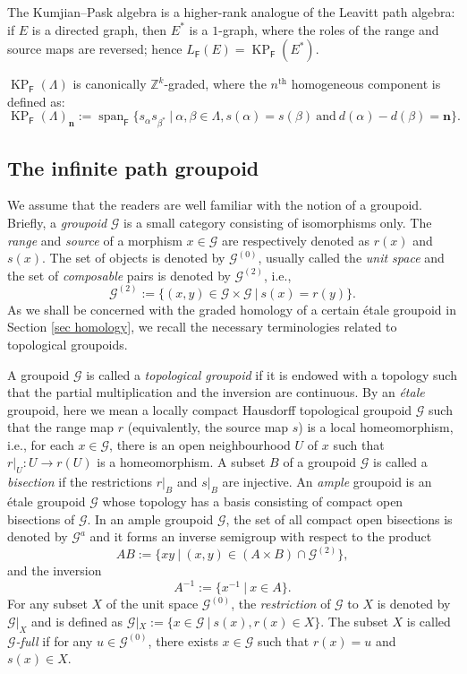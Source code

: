 \documentclass[12pt]{amsart}
\newcommand{\N}{\mathbf{n}}
\newcommand{\KP}{\operatorname{KP}}
\theoremstyle{definition}
\theoremstyle{remark}
\newcommand{\lspan}{\operatorname{span}}
\begin{document}
The Kumjian--Pask algebra is a higher-rank analogue of the Leavitt path algebra: if $E$ is a directed graph, then $E^*$ is a $1$-graph, where the roles of the range and source maps are reversed; hence $L_\mathsf{F} (E) = \KP_{\mathsf{F}} ( E^* )$.

$\KP_{\mathsf{F}} ( \Lambda )$ is canonically $\mathbb{Z}^k$-graded, where the $n^{\text{th}}$ homogeneous component is defined as: \[\KP_\mathsf{F}(\Lambda)_\N:=\lspan_\mathsf{F} \{s_\alpha s_{\beta^*}~|~\alpha,\beta\in \Lambda, s(\alpha)=s(\beta)~\text{and}~d(\alpha)-d(\beta)=\N\}.\]


\subsection{The infinite path groupoid}\label{ssec path groupoid}
We assume that the readers are well familiar with the notion of a groupoid. Briefly, a \emph{groupoid} $\mathcal{G}$ is a small category consisting of isomorphisms only. The \emph{range} and \emph{source} of a morphism $x\in \mathcal{G}$ are respectively denoted as $r(x)$ and $s(x)$. The set of objects is denoted by $\mathcal{G}^{(0)}$, usually called the \emph{unit space} and the set of \emph{composable} pairs is denoted by $\mathcal{G}^{(2)}$, i.e., \[\mathcal{G}^{(2)}:=\{(x,y)\in \mathcal{G}\times \mathcal{G}~|~s(x)=r(y)\}.\] As we shall be concerned with the graded homology of a certain \'{e}tale groupoid in Section \ref{sec homology}, we recall the necessary terminologies related to topological groupoids.

A groupoid $\mathcal{G}$ is called a \emph{topological groupoid} if it is endowed with a topology such that the partial multiplication and the inversion are continuous. By an \emph{\'{e}tale} groupoid, here we mean a locally compact Hausdorff topological groupoid $\mathcal{G}$ such that the range map $r$ (equivalently, the source map $s$) is a local homeomorphism, i.e., for each $x\in \mathcal{G}$, there is an open neighbourhood $U$ of $x$ such that $r|_U:U\longrightarrow r(U)$ is a homeomorphism. A subset $B$ of a groupoid $\mathcal{G}$ is called a \emph{bisection} if the restrictions $r|_B$ and $s|_B$ are injective. An \emph{ample} groupoid is an \'{e}tale groupoid $\mathcal{G}$ whose topology has a basis consisting of compact open bisections of $\mathcal{G}$. In an ample groupoid $\mathcal{G}$, the set of all compact open bisections is denoted by $\mathcal{G}^a$ and it forms an inverse semigroup with respect to the product \[AB:=\{xy~|~(x,y)\in (A\times B)\cap \mathcal{G}^{(2)}\},\] and the inversion \[A^{-1}:=\{x^{-1}~|~x\in A\}.\] For any subset $X$ of the unit space $\mathcal{G}^{(0)}$, the \emph{restriction} of $\mathcal{G}$ to $X$ is denoted by $\mathcal{G}|_X$ and is defined as $\mathcal{G}|_X:=\{x\in \mathcal{G}~|~s(x),r(x)\in X\}$. The subset $X$ is called \emph{$\mathcal{G}$-full} if for any $u\in \mathcal{G}^{(0)}$, there exists $x\in \mathcal{G}$ such that $r(x)=u$ and $s(x)\in X$. 
\end{document}

